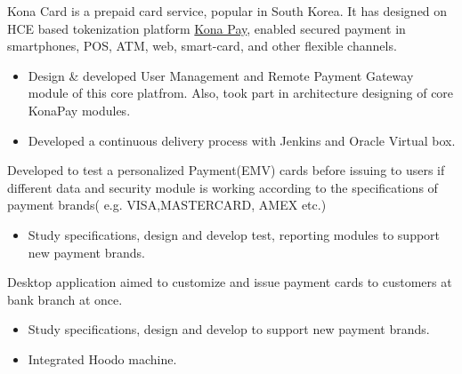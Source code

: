 \documentclass[10pt,a4paper,ragged2e]{altacv}
\begin{document}







Kona Card is a prepaid card service, popular in South Korea. It has designed on HCE based tokenization platform \href{https://konasl.com/digitization-platform/kona-pay/}{Kona Pay}, enabled secured payment in smartphones, POS, ATM, web, smart-card, and other flexible channels.
  \begin{itemize}
    \item Design \& developed User Management and Remote Payment Gateway module of this core platfrom. Also, took part in architecture designing of core KonaPay modules.
    \item Developed a continuous delivery process with Jenkins and Oracle Virtual box.
  \end{itemize}
  






Developed to test a personalized Payment(EMV) cards before issuing to users if different data and security module is working according to the specifications of payment brands( e.g. VISA,MASTERCARD, AMEX etc.)
\begin{itemize}
    \item Study specifications, design and develop test, reporting modules to support new payment brands.
\end{itemize}








Desktop application aimed to customize and issue payment cards to customers at bank branch at once.
\begin{itemize}
    \item Study specifications, design and develop to support new payment brands.
    \item Integrated Hoodo machine.
\end{itemize}
\end{document}
